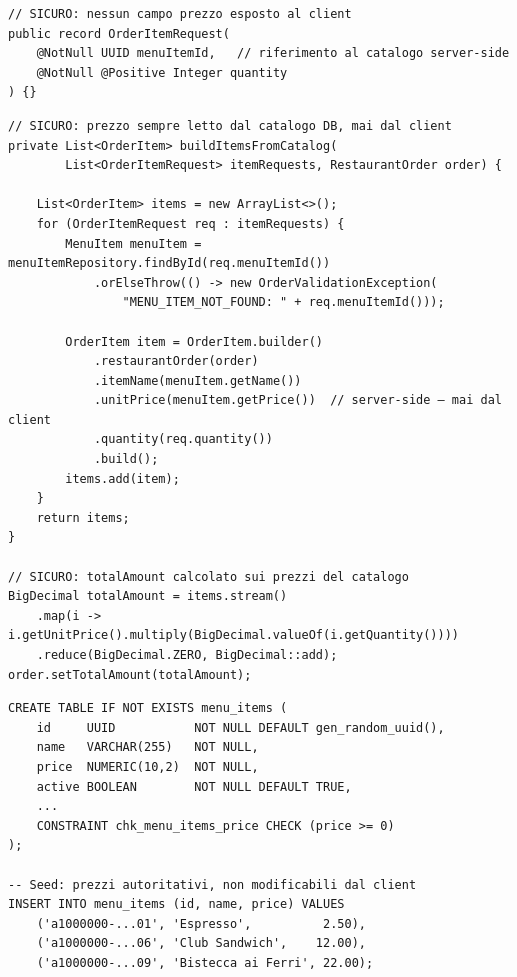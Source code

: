 ﻿\documentclass[a4paper,12pt]{report}
\begin{document}
\begin{securebox}[title={Codice Sicuro --- OrderItemRequest.java (fix)}]
\begin{lstlisting}[style=java]
// SICURO: nessun campo prezzo esposto al client
public record OrderItemRequest(
    @NotNull UUID menuItemId,   // riferimento al catalogo server-side
    @NotNull @Positive Integer quantity
) {}
\end{lstlisting}
\end{securebox}

\begin{securebox}[title={Codice Sicuro --- buildItemsFromCatalog() nel service}]
\begin{lstlisting}[style=java]
// SICURO: prezzo sempre letto dal catalogo DB, mai dal client
private List<OrderItem> buildItemsFromCatalog(
        List<OrderItemRequest> itemRequests, RestaurantOrder order) {

    List<OrderItem> items = new ArrayList<>();
    for (OrderItemRequest req : itemRequests) {
        MenuItem menuItem = menuItemRepository.findById(req.menuItemId())
            .orElseThrow(() -> new OrderValidationException(
                "MENU_ITEM_NOT_FOUND: " + req.menuItemId()));

        OrderItem item = OrderItem.builder()
            .restaurantOrder(order)
            .itemName(menuItem.getName())
            .unitPrice(menuItem.getPrice())  // server-side — mai dal client
            .quantity(req.quantity())
            .build();
        items.add(item);
    }
    return items;
}

// SICURO: totalAmount calcolato sui prezzi del catalogo
BigDecimal totalAmount = items.stream()
    .map(i -> i.getUnitPrice().multiply(BigDecimal.valueOf(i.getQuantity())))
    .reduce(BigDecimal.ZERO, BigDecimal::add);
order.setTotalAmount(totalAmount);
\end{lstlisting}
\end{securebox}

\begin{securebox}[title={V2\_\_add\_menu\_items.sql --- catalogo prezzi server-side}]
\begin{lstlisting}[style=sql]
CREATE TABLE IF NOT EXISTS menu_items (
    id     UUID           NOT NULL DEFAULT gen_random_uuid(),
    name   VARCHAR(255)   NOT NULL,
    price  NUMERIC(10,2)  NOT NULL,
    active BOOLEAN        NOT NULL DEFAULT TRUE,
    ...
    CONSTRAINT chk_menu_items_price CHECK (price >= 0)
);

-- Seed: prezzi autoritativi, non modificabili dal client
INSERT INTO menu_items (id, name, price) VALUES
    ('a1000000-...01', 'Espresso',          2.50),
    ('a1000000-...06', 'Club Sandwich',    12.00),
    ('a1000000-...09', 'Bistecca ai Ferri', 22.00);
\end{lstlisting}
\end{securebox}
\end{document}
